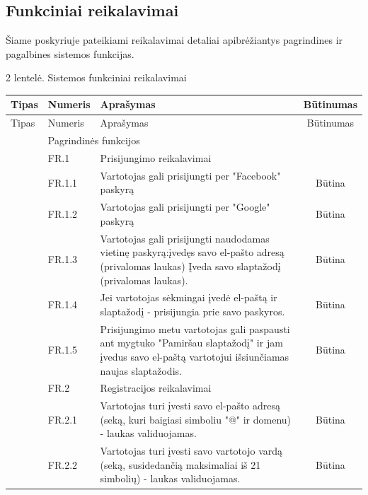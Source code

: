 \documentclass{VUMIFPSkursinis}
\begin{document}
 \newpage 
\subsection{Funkciniai reikalavimai}
Šiame poskyriuje pateikiami reikalavimai detaliai apibrėžiantys pagrindines ir pagalbines sistemos funkcijas. 

\centerline{2 lentelė. Sistemos funkciniai reikalavimai} 
\begin{longtable}{|p{1cm}|p{3cm}|p{9cm}|c|}
\hline
Tipas & Numeris & Aprašymas & Būtinumas \\ \hline
\endfirsthead
\hline
Tipas & Numeris & Aprašymas & Būtinumas \\ \hline
\endhead
\hline
\endfoot
\hline
\multirow{71}{*}{\rotatebox{90}{~~~~~~~~~~~~~~~~~~~~~~~~~~~~~~~~~~~~~~~~~~~~~~~~~~~~~~~~~~~~~~~~~~~~~~~~~~~~~~~~~~~~~~~~~~~~~~~~~~~~~~~~~~~~~~~~~~~~~~~~~~~~~~~~~~~~~~~~~~~~~~~~~~~~~~~~~~~~~~~~~~~~~~~~~~~~~~~~~~~~~~~~~~~~~~~~~~~~~~~~~~~~~~~~~~~~~~~~~~~~~~~~~~~~~~~~~~~~~Funkciniai reikalavimai}} & \multicolumn{3}{l|}{ \cellcolor{light-gray}Pagrindinės funkcijos} \\ \cline{2-4} 
 &  \cellcolor{light-gray}FR.1 & \multicolumn{2}{l|}{ \cellcolor{light-gray}Prisijungimo reikalavimai} \\ \cline{2-4} 
 & FR.1.1 & Vartotojas gali prisijungti per "Facebook" paskyrą & Būtina \\ \cline{2-4} 
 & FR.1.2 & Vartotojas gali prisijungti per "Google" paskyrą & Būtina \\ \cline{2-4} 
 & FR.1.3 & Vartotojas gali prisijungti naudodamas vietinę paskyrą:įvedęs savo el-pašto adresą (privalomas laukas) Įveda savo slaptažodį (privalomas laukas). & Būtina \\ \cline{2-4} 
 & FR.1.4 & Jei vartotojas sėkmingai įvedė el-paštą ir slaptažodį - prisijungia prie savo paskyros. & Būtina \\ \cline{2-4} 
 & FR.1.5 & Prisijungimo metu vartotojas gali paspausti ant mygtuko "Pamiršau slaptažodį" ir jam įvedus savo el-paštą vartotojui išsiunčiamas naujas slaptažodis. & Būtina \\ \cline{2-4} 
 &  \cellcolor{light-gray}FR.2 & \multicolumn{2}{l|}{ \cellcolor{light-gray}Registracijos reikalavimai} \\ \cline{2-4} 
 & FR.2.1 & Vartotojas turi įvesti savo el-pašto adresą (seką, kuri baigiasi simboliu "@" ir domenu) - laukas validuojamas. & Būtina \\ \cline{2-4} 
 & FR.2.2 & Vartotojas turi įvesti savo vartotojo vardą (seką, susidedančią maksimaliai iš 21 simbolių) - laukas validuojamas. & Būtina \\ \cline{2-4} 

\end{longtable}
\end{document}

